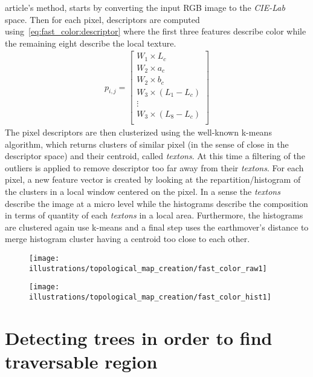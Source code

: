 \cite{rufus_blas_fast_2008} article's method, starts by converting the input RGB image to the \textit{CIE-Lab} space.
Then for each pixel, descriptors are computed using~\cref{eq:fast_color:descriptor} where the first three features
describe color while the remaining eight describe the local texture.
\begin{align}
    \label{eq:fast_color:descriptor}
    p_{i,j} = \begin{bmatrix}
                  W_1 \times L_c         \\
                  W_2 \times a_c         \\
                  W_2 \times b_c         \\
                  W_3 \times (L_1 - L_c) \\
                  \vdots                 \\
                  W_3 \times (L_8 - L_c) \\
    \end{bmatrix}
\end{align}
The pixel descriptors are then clusterized using the well-known k-means algorithm, which returns clusters of similar
pixel (in the sense of close in the descriptor space) and their centroid, called \textit{textons}.
At this time a filtering of the outliers is applied to remove descriptor too far away from their \textit{textons}.
For each pixel, a new feature vector is created by looking at the repartition/histogram of the clusters in a local
window centered on the pixel.
In a sense the \textit{textons} describe the image at a micro level while the histograms describe the composition in terms
of quantity of each \textit{textons} in a local area.
Furthermore, the histograms are clustered again use k-means and a final step uses the earthmover's distance to
merge histogram cluster having a centroid too close to each other.

\begin{figure}
    \centering
    \texttt{[image: illustrations/topological\_map\_creation/fast\_color\_raw1]}
\end{figure}

\begin{figure}
    \centering
    \texttt{[image: illustrations/topological\_map\_creation/fast\_color\_hist1]}
\end{figure}



\section{Detecting trees in order to find traversable region}

